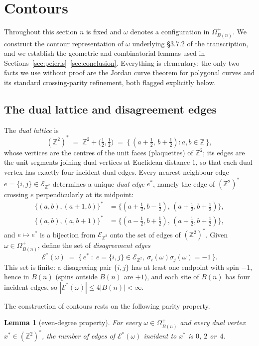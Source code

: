 \documentclass[11pt]{article}
\theoremstyle{plain}
\newtheorem{lemma}[theorem]{Lemma}
\theoremstyle{definition}
\theoremstyle{remark}
\newcommand{\Z}{\mathbb{Z}}
\newcommand{\sg}{\sigma}
\newcommand{\Eset}{\mathscr{E}}
\newcommand{\dualZ}{(\Z^2)^*}       %
\newcommand{\dedges}{\mathscr{E}^*} %
\begin{document}
\section{Contours}
\label{sec:contours}

Throughout this section $n$ is fixed and $\omega$ denotes a configuration in
$\Omega^{+}_{B(n)}$. We construct the contour representation of $\omega$
underlying \S3.7.2 of the transcription, and we establish the geometric and
combinatorial lemmas used in
Sections~\ref{sec:peierls}--\ref{sec:conclusion}. Everything is elementary;
the only two facts we use without proof are the Jordan curve theorem for
polygonal curves and its standard crossing-parity refinement, both flagged
explicitly below.

\subsection{The dual lattice and disagreement edges}

The \emph{dual lattice} is
\[
  \dualZ \;=\; \Z^2+\big(\tfrac12,\tfrac12\big)
  \;=\;\big\{\,(a+\tfrac12,\,b+\tfrac12) : a,b\in\Z \,\big\},
\]
whose vertices are the centres of the unit faces (plaquettes) of $\Z^2$; its
edges are the unit segments joining dual vertices at Euclidean distance $1$,
so that each dual vertex has exactly four incident dual edges. Every
nearest-neighbour edge $e=\{i,j\}\in\Eset_{\Z^2}$ determines a unique
\emph{dual edge} $e^*$, namely the edge of $\dualZ$ crossing $e$
perpendicularly at its midpoint:
\begin{align*}
  \{(a,b),(a+1,b)\}^*&=\big\{(a+\tfrac12,b-\tfrac12),\,(a+\tfrac12,b+\tfrac12)\big\},\\
  \{(a,b),(a,b+1)\}^*&=\big\{(a-\tfrac12,b+\tfrac12),\,(a+\tfrac12,b+\tfrac12)\big\},
\end{align*}
and $e\mapsto e^*$ is a bijection from $\Eset_{\Z^2}$ onto the set of edges
of $\dualZ$. Given $\omega\in\Omega^{+}_{B(n)}$, define the set of
\emph{disagreement edges}
\[
  \dedges(\omega)
  \;=\;\big\{\, e^* \;:\; e=\{i,j\}\in\Eset_{\Z^2},\
        \sg_i(\omega)\sg_j(\omega)=-1 \,\big\}.
\]
This set is finite: a disagreeing pair $\{i,j\}$ has at least one endpoint
with spin $-1$, hence in $B(n)$ (spins outside $B(n)$ are $+1$), and each
site of $B(n)$ has four incident edges, so
$|\dedges(\omega)|\le 4|B(n)|<\infty$.

The construction of contours rests on the following parity property.

\begin{lemma}[even-degree property]
For every $\omega\in\Omega^{+}_{B(n)}$ and every dual vertex $x^*\in\dualZ$,
the number of edges of $\dedges(\omega)$ incident to $x^*$ is $0$, $2$
or~$4$.
\end{lemma}
\end{document}
